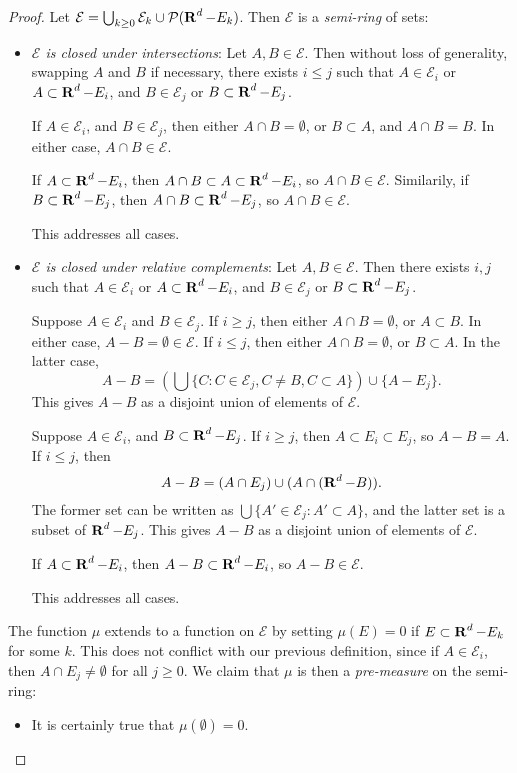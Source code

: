 \begin{proof}
	Let $\mathcal{E} = \bigcup_{k \geq 0} \mathcal{E}_k \cup \mathcal{P}(\operatorname{\mathbf{R}}^d - E_k)$. Then $\mathcal{E}$ is a \emph{semi-ring} of sets:
	\begin{itemize}
		\item \emph{$\mathcal{E}$ is closed under intersections}: Let $A, B \in \mathcal{E}$. Then without loss of generality, swapping $A$ and $B$ if necessary, there exists $i \leq j$ such that $A \in \mathcal{E}_i$ or $A \subset \operatorname{\mathbf{R}}^d - E_i$, and $B \in \mathcal{E}_j$ or $B \subset \operatorname{\mathbf{R}}^d - E_j$.

		If $A \in \mathcal{E}_i$, and $B \in \mathcal{E}_j$, then either $A \cap B = \emptyset$, or $B \subset A$, and $A \cap B = B$. In either case, $A \cap B \in \mathcal{E}$.

		If $A \subset \operatorname{\mathbf{R}}^d - E_i$, then $A \cap B \subset A \subset \operatorname{\mathbf{R}}^d - E_i$, so $A \cap B \in \mathcal{E}$. Similarily, if $B \subset \operatorname{\mathbf{R}}^d - E_j$, then $A \cap B \subset \operatorname{\mathbf{R}}^d - E_j$, so $A \cap B \in \mathcal{E}$.

		This addresses all cases.

		\item \emph{$\mathcal{E}$ is closed under relative complements}: Let $A,B \in \mathcal{E}$. Then there exists $i,j$ such that $A \in \mathcal{E}_i$ or $A \subset \operatorname{\mathbf{R}}^d - E_i$, and $B \in \mathcal{E}_j$ or $B \subset \operatorname{\mathbf{R}}^d - E_j$.

		Suppose $A \in \mathcal{E}_i$ and $B \in \mathcal{E}_j$. If $i \geq j$, then either $A \cap B = \emptyset$, or $A \subset B$. In either case, $A - B = \emptyset \in \mathcal{E}$. If $i \leq j$, then either $A \cap B = \emptyset$, or $B \subset A$. In the latter case,
		\[ A - B = \left( \bigcup \{ C : C \in \mathcal{E}_j, C \neq B, C \subset A \} \right) \cup \{ A - E_j \}. \]
		This gives $A - B$ as a disjoint union of elements of $\mathcal{E}$.

		Suppose $A \in \mathcal{E}_i$, and $B \subset \operatorname{\mathbf{R}}^d - E_j$. If $i \geq j$, then $A \subset E_i \subset E_j$, so $A - B = A$. If $i \leq j$, then
		\[ A - B = (A \cap E_j) \cup (A \cap (\operatorname{\mathbf{R}}^d - B)). \]
		The former set can be written as $\bigcup \{ A' \in \mathcal{E}_j : A' \subset A \}$, and the latter set is a subset of $\operatorname{\mathbf{R}}^d - E_j$. This gives $A - B$ as a disjoint union of elements of $\mathcal{E}$.

		If $A \subset \operatorname{\mathbf{R}}^d - E_i$, then $A - B \subset \operatorname{\mathbf{R}}^d - E_i$, so $A - B \in \mathcal{E}$.

		This addresses all cases.
	\end{itemize}
	The function $\mu$ extends to a function on $\mathcal{E}$ by setting $\mu(E) = 0$ if $E \subset \operatorname{\mathbf{R}}^d - E_k$ for some $k$. This does not conflict with our previous definition, since if $A \in \mathcal{E}_i$, then $A \cap E_j \neq \emptyset$ for all $j \geq 0$. We claim that $\mu$ is then a \emph{pre-measure} on the semi-ring:
	\begin{itemize}
		\item It is certainly true that $\mu(\emptyset) = 0$.


\end{itemize}
\end{proof}
